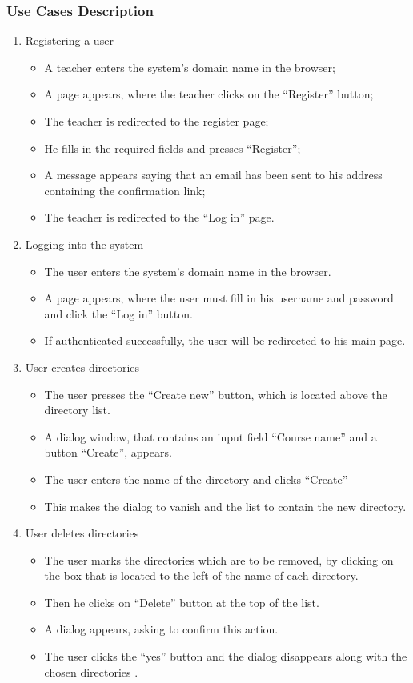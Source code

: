 \subsubsection{Use Cases Description}
\begin{enumerate}
  \item Registering a user
  \begin{itemize}
    \item A teacher enters the system’s domain name in the browser;
    \item A page appears, where the teacher clicks on the “Register” button;
    \item The teacher is redirected to the register page;
    \item He fills in the required fields and presses “Register”;
    \item A message appears saying that an email has been sent to his address containing the confirmation link;
    \item The teacher is redirected to the “Log in” page.
  \end{itemize}

  \item Logging into the system 
  \begin{itemize}
    \item The user enters the system’s domain name in the browser. 
    \item A page appears, where the user must fill in his username and password and click the “Log in” button. 
    \item If authenticated successfully, the user will be redirected to his main page.
  \end{itemize}

  \item User creates directories
  \begin{itemize}
    \item The user presses the “Create new” button, which is located above the directory list.
    \item A dialog window, that contains an input field  “Course name” and a button “Create”, appears.
    \item The user enters the name of  the directory and clicks “Create”
    \item This makes the dialog to vanish and the list to contain the new directory.
  \end{itemize}

  \item User deletes directories
  \begin{itemize}
    \item The user marks the directories which are to be removed, by clicking on the box that is located to the left of the name of each directory. 
    \item Then he clicks on “Delete” button at the top of the list.
    \item A dialog appears, asking to confirm this action.
    \item The user clicks the “yes” button and the dialog disappears along with the chosen directories .
  \end{itemize}


\end{enumerate}
